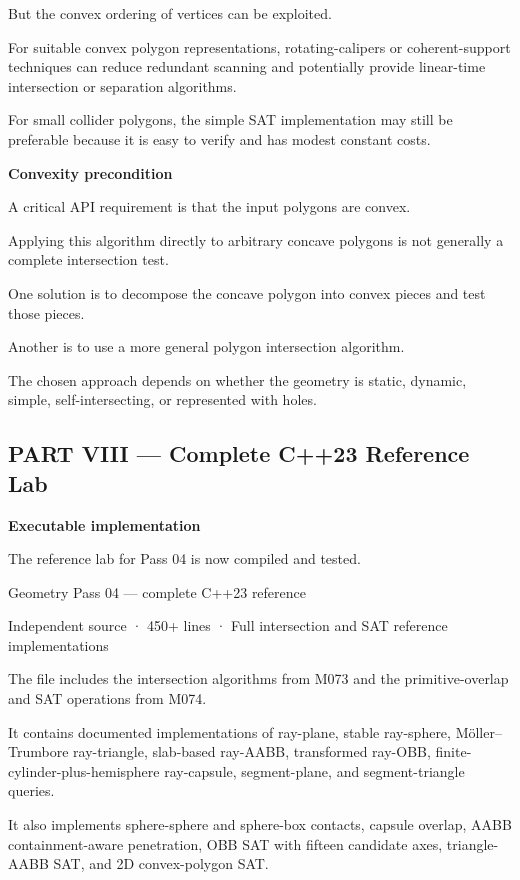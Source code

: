 But the convex ordering of vertices can be exploited.

For suitable convex polygon representations, rotating-calipers or coherent-support techniques can reduce redundant scanning and potentially provide linear-time intersection or separation algorithms.

For small collider polygons, the simple SAT implementation may still be preferable because it is easy to verify and has modest constant costs.

\textbf{Convexity precondition}

A critical API requirement is that the input polygons are convex.

Applying this algorithm directly to arbitrary concave polygons is not generally a complete intersection test.

One solution is to decompose the concave polygon into convex pieces and test those pieces.

Another is to use a more general polygon intersection algorithm.

The chosen approach depends on whether the geometry is static, dynamic, simple, self-intersecting, or represented with holes.

\subsection{PART VIII --- Complete C++23 Reference Lab}\label{04-visual-computing-ii-ch025-part-viii-complete-c23-reference-lab}

\textbf{Executable implementation}

The reference lab for Pass 04 is now compiled and tested.

Geometry Pass 04 --- complete C++23 reference

Independent source · 450+ lines · Full intersection and SAT reference implementations

The file includes the intersection algorithms from M073 and the primitive-overlap and SAT operations from M074.

It contains documented implementations of ray-plane, stable ray-sphere, Möller--Trumbore ray-triangle, slab-based ray-AABB, transformed ray-OBB, finite-cylinder-plus-hemisphere ray-capsule, segment-plane, and segment-triangle queries.

It also implements sphere-sphere and sphere-box contacts, capsule overlap, AABB containment-aware penetration, OBB SAT with fifteen candidate axes, triangle-AABB SAT, and 2D convex-polygon SAT.

